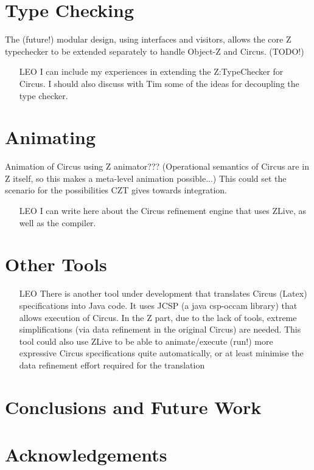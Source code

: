 \documentclass{llncs}
\begin{document}
\section{Type Checking}

      The (future!) modular design, using interfaces and visitors,
      allows the core Z typechecker to be extended separately
      to handle Object-Z and Circus.  (TODO!)

    \begin{itemize}
        \item[LEO] I can include my experiences in extending the Z:TypeChecker for Circus.
                    I should also discuss with Tim some of the ideas for decoupling the type checker.
    \end{itemize}

\section{Animating}

    Animation of Circus using Z animator???
      (Operational semantics of Circus are in Z itself, so this makes a meta-level animation possible...)
    This could set the scenario for the possibilities CZT gives towards integration.

    \begin{itemize}
        \item[LEO] I can write here about the Circus refinement engine that uses ZLive, as well as the compiler.
    \end{itemize}


\section{Other Tools}

    \begin{itemize}
        \item[LEO]
        There is another tool under development that translates Circus (Latex) specifications into Java code.
        It uses JCSP (a java csp-occam library) that allows execution of Circus.
        In the Z part, due to the lack of tools, extreme simplifications (via data refinement in the original Circus)
        are needed.
        This tool could also use ZLive to be able to animate/execute (run!) more expressive Circus specifications quite
        automatically, or at least minimise the data refinement effort required for the translation
    \end{itemize}


\section{Conclusions and Future Work} \label{sec:conclusions}

\section*{Acknowledgements}



\end{document}
